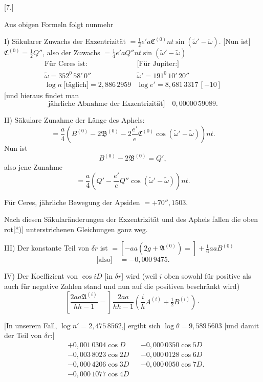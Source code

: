 \par\bigskip
\begin{center}[7.]\end{center}
\noindent\hspace*{\parindent}Aus obigen Formeln folgt nunmehr

I) Säkularer Zuwachs der Exzentrizität \(=\tfrac12e'a\mathfrak C^{(0)}nt\sin(\tilde\omega'-\tilde\omega)\). [Nun ist] \(\mathfrak C^{(0)}=\tfrac12Q''\), also der Zuwachs \(=\tfrac14e'aQ''nt\sin(\tilde\omega'-\tilde\omega)\)
\[
\begin{array}{cc}
\text{Für Ceres ist:}&\text{[Für Jupiter:]}\\[.5ex]
\tilde\omega=352^{0}\,58'\,0''&\tilde\omega'=191^{0}\,10'\,20''\\[.5ex]
\log n\ \text{[täglich]}=2{,}886\,2959&\log e'=8{,}681\,3317\,[-10]
\end{array}
\]
[und hieraus findet man
\[
\text{jährliche Abnahme der Exzentrizität]}\quad0{,}00000\,59089.
\]

II) Säkulare Zunahme der Länge des Aphels:
\[
=\frac a4\left(B^{(0)}-2\mathfrak B^{(0)}-2\frac{e'}e\mathfrak C^{(0)}\cos(\tilde\omega'-\tilde\omega)\right)nt.
\]
Nun ist
\[
B^{(0)}-2\mathfrak B^{(0)}=Q',
\]
also jene Zunahme
\[
=\frac a4\left(Q'-\frac{e'}eQ''\cos(\tilde\omega'-\tilde\omega)\right)nt.
\]

Für Ceres, jährliche Bewegung der Apsiden \(=+70''{,}1503.\)

Nach diesen Säkularänderungen der Exzentrizität und des Aphels fallen die oben rot\hyperlink{ceres7-note}{[*)]}\begingroup
\makeatletter
\long\def\@makefntext#1{\noindent[*) #1}
\makeatother
\footnotetext{\hypertarget{ceres7-note}{}Seite 389, wo sie auch im Abdruck unterstrichen sind.]}
\endgroup{} unterstrichenen Gleichungen ganz weg.

III) Der konstante Teil von \(\delta r\) ist \(=[-aa(2g+\mathfrak A^{(0)})=]+\tfrac16aaB^{(0)}\)
\[
\text{[also]}\quad=-0{,}000\,9475.
\]

IV) Der Koeffizient von \(\cos iD\) [in \(\delta r\)] wird (weil \(i\) oben sowohl für positive als auch für negative Zahlen stand und nun auf die positiven beschränkt wird)
\[
\left[\frac{2aa\mathfrak A^{(i)}}{hh-1}=\right]\frac{2aa}{hh-1}\left(\frac ihA^{(i)}+\tfrac12B^{(i)}\right)\mathpunct{\cdot}
\]

\hypertarget{native-398}{}[In unserem Fall, \(\log n'=2{,}475\,8562\),] ergibt sich \(\log\theta=9{,}589\,5603\) [und damit der Teil von \(\delta r\):]
\[
\begin{aligned}
&+0{,}001\,0304\cos D&&-0{,}000\,0350\cos5D\\
&-0{,}003\,8023\cos2D&&-0{,}000\,0128\cos6D\\
&-0{,}000\,4206\cos3D&&-0{,}000\,0050\cos7D.\\
&-0{,}000\,1077\cos4D
\end{aligned}
\]

